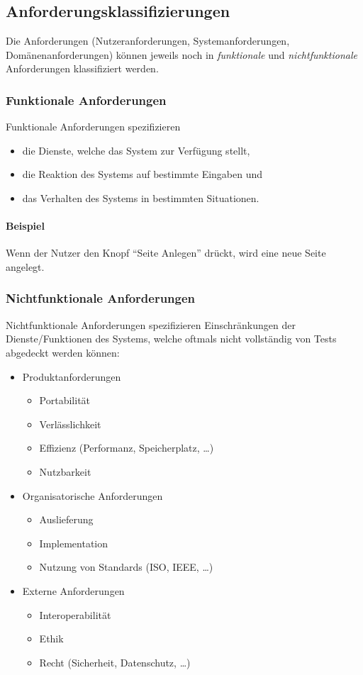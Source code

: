 		\subsection{Anforderungsklassifizierungen}
			Die Anforderungen (Nutzeranforderungen, Systemanforderungen, Domänenanforderungen) können jeweils noch in \textit{funktionale} und \textit{nichtfunktionale} Anforderungen klassifiziert werden.
			
			\subsubsection{Funktionale Anforderungen}
				Funktionale Anforderungen spezifizieren
				\begin{itemize}
					\item die Dienste, welche das System zur Verfügung stellt,
					\item die Reaktion des Systems auf bestimmte Eingaben und
					\item das Verhalten des Systems in bestimmten Situationen.
				\end{itemize}
				
				\paragraph{Beispiel}
					Wenn der Nutzer den Knopf \enquote{Seite Anlegen} drückt, wird eine neue Seite angelegt.
			
			\subsubsection{Nichtfunktionale Anforderungen}
				Nichtfunktionale Anforderungen spezifizieren Einschränkungen der Dienste/Funktionen des Systems, welche oftmals nicht vollständig von Tests abgedeckt werden können:
				\begin{itemize}
					\item Produktanforderungen
						\begin{itemize}
							\item Portabilität
							\item Verlässlichkeit
							\item Effizienz (Performanz, Speicherplatz, \dots)
							\item Nutzbarkeit
						\end{itemize}
					\item Organisatorische Anforderungen
						\begin{itemize}
							\item Auslieferung
							\item Implementation
							\item Nutzung von Standards (ISO, IEEE, \dots)
						\end{itemize}
					\item Externe Anforderungen
						\begin{itemize}
							\item Interoperabilität
							\item Ethik
							\item Recht (Sicherheit, Datenschutz, \dots)
						\end{itemize}
				\end{itemize}
				

